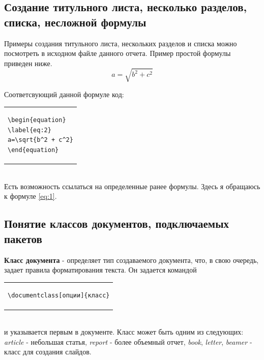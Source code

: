 \documentclass[10pt,a4paper,titlepage]{article}
\begin{document}
\subsection{Создание титульного листа, несколько разделов, списка, несложной формулы}
Примеры создания титульного листа, нескольких разделов и списка можно посмотреть в исходном файле данного отчета. Пример простой формулы приведен ниже.\\
\begin{equation}
\label{eq:1}
a=\sqrt{b^2 + c^2}
\end{equation}

Соответсвующий данной формуле код:\\
\begin{tabular}{|p{12cm}|}
  \begin{verbatim}
\begin{equation}
\label{eq:2}
a=\sqrt{b^2 + c^2}
\end{equation}
  \end{verbatim}
\end{tabular}\\

Есть возможность ссылаться на определенные ранее формулы. Здесь я обращаюсь к формуле \eqref{eq:1}.
\subsection{Понятие классов документов, подключаемых \mbox{пакетов}}
\textbf{Класс документа} - определяет тип создаваемого документа, что, в свою очередь, задает правила форматирования текста. Он задается командой\\
\begin{tabular}{|p{12cm}|}
  \begin{verbatim}
\documentclass[опции]{класс}
  \end{verbatim}
\end{tabular}\\
\newline
и указывается первым в документе. Класс может быть одним из следующих: \textit{article} - небольшая статья, \textit{report} - более объемный отчет, \textit{book}, \textit{letter}, \textit{beamer} - класс для создания слайдов.
\end{document}
